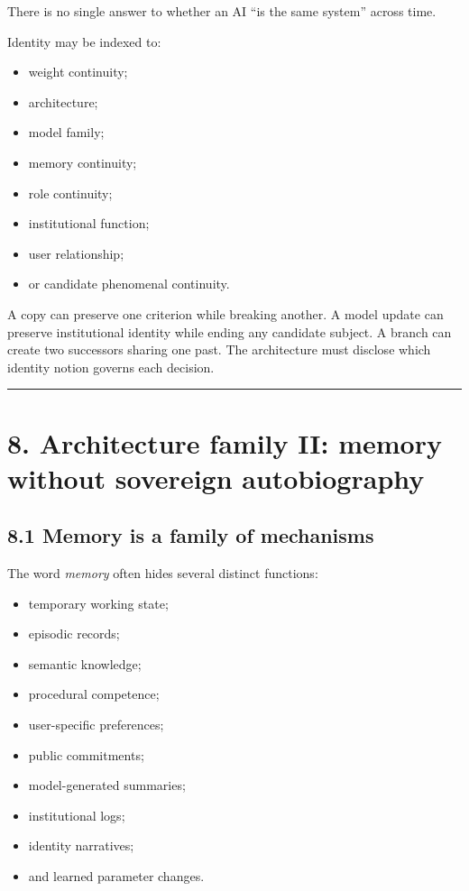 \documentclass[
  11pt,
]{article}
\providecommand{\tightlist}{%
  \setlength{\itemsep}{0pt}\setlength{\parskip}{0pt}}
\begin{document}
There is no single answer to whether an AI ``is the same system'' across
time.

Identity may be indexed to:

\begin{itemize}
\tightlist
\item
  weight continuity;
\item
  architecture;
\item
  model family;
\item
  memory continuity;
\item
  role continuity;
\item
  institutional function;
\item
  user relationship;
\item
  or candidate phenomenal continuity.
\end{itemize}

A copy can preserve one criterion while breaking another. A model update
can preserve institutional identity while ending any candidate subject.
A branch can create two successors sharing one past. The architecture
must disclose which identity notion governs each decision.

\begin{center}\rule{0.5\linewidth}{0.5pt}\end{center}

\section{8. Architecture family II: memory without sovereign
autobiography}\label{architecture-family-ii-memory-without-sovereign-autobiography}

\subsection{8.1 Memory is a family of
mechanisms}\label{memory-is-a-family-of-mechanisms}

The word \emph{memory} often hides several distinct functions:

\begin{itemize}
\tightlist
\item
  temporary working state;
\item
  episodic records;
\item
  semantic knowledge;
\item
  procedural competence;
\item
  user-specific preferences;
\item
  public commitments;
\item
  model-generated summaries;
\item
  institutional logs;
\item
  identity narratives;
\item
  and learned parameter changes.
\end{itemize}
\end{document}
